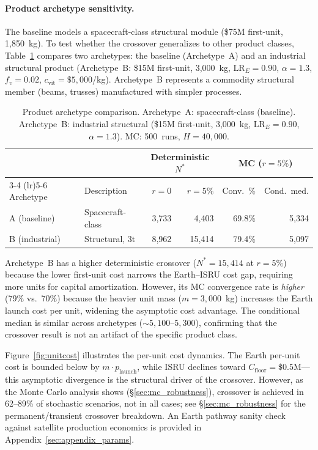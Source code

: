 \documentclass[preprint,12pt]{elsarticle}
\begin{document}
\paragraph{Product archetype sensitivity.} The baseline models a spacecraft-class structural module (\$75M first-unit, 1{,}850~kg). To test whether the crossover generalizes to other product classes, Table~\ref{tab:archetypes} compares two archetypes: the baseline (Archetype~A) and an industrial structural product (Archetype~B: \$15M first-unit, 3{,}000~kg, $\mathrm{LR}_E = 0.90$, $\alpha = 1.3$, $f_v = 0.02$, $c_{\mathrm{vit}} = \$5{,}000$/kg). Archetype~B represents a commodity structural member (beams, trusses) manufactured with simpler processes.

\begin{table}[htbp]
\centering
\caption{Product archetype comparison. Archetype~A: spacecraft-class (baseline). Archetype~B: industrial structural (\$15M first-unit, 3{,}000~kg, $\mathrm{LR}_E = 0.90$, $\alpha = 1.3$). MC: 500~runs, $H = 40{,}000$.}
\label{tab:archetypes}
\small
\begin{tabular}{@{}llrrrr@{}}
\toprule
 & & \multicolumn{2}{c}{Deterministic $N^*$} & \multicolumn{2}{c}{MC ($r = 5\%$)} \\
\cmidrule(lr){3-4} \cmidrule(lr){5-6}
Archetype & Description & $r = 0$ & $r = 5\%$ & Conv.\ \% & Cond.\ med. \\
\midrule
A (baseline)   & Spacecraft-class   & 3{,}733  & 4{,}403  & 69.8\%  & 5{,}334 \\
B (industrial) & Structural, 3t     & 8{,}962  & 15{,}414 & 79.4\%  & 5{,}097 \\
\bottomrule
\end{tabular}
\end{table}

Archetype~B has a higher deterministic crossover ($N^* = 15{,}414$ at $r = 5\%$) because the lower first-unit cost narrows the Earth--ISRU cost gap, requiring more units for capital amortization. However, its MC convergence rate is \emph{higher} (79\% vs.\ 70\%) because the heavier unit mass ($m = 3{,}000$~kg) increases the Earth launch cost per unit, widening the asymptotic cost advantage. The conditional median is similar across archetypes (${\sim}5{,}100$--$5{,}300$), confirming that the crossover result is not an artifact of the specific product class.

Figure~\ref{fig:unitcost} illustrates the per-unit cost dynamics. The Earth per-unit cost is bounded below by $m \cdot p_{\mathrm{launch}}$, while ISRU declines toward $C_{\mathrm{floor}} = \$0.5$M---this asymptotic divergence is the structural driver of the crossover. However, as the Monte Carlo analysis shows (\S\ref{sec:mc_robustness}), crossover is achieved in 62--89\% of stochastic scenarios, not in all cases; see \S\ref{sec:mc_robustness} for the permanent/transient crossover breakdown. An Earth pathway sanity check against satellite production economics is provided in Appendix~\ref{sec:appendix_params}.
\end{document}
